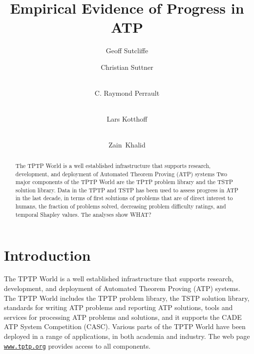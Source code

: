 \documentclass[runningheads]{llncs}
\begin{document}
\title{Empirical Evidence of Progress in ATP}

\author{
Geoff Sutcliffe
\and
Christian Suttner
\and \\
C. Raymond Perrault
\and \\
Lars Kotthoff
\and \\
Zain~Khalid
}

\maketitle
\begin{abstract}
The TPTP World is a well established infrastructure that supports research, development, and 
deployment of Automated Theorem Proving (ATP) systems
Two major components of the TPTP World are the TPTP problem library and the TSTP solution library.
Data in the TPTP and TSTP has been used to assess progress in ATP in the last decade, in
terms of first solutions of problems that are of direct interest to humans, the fraction of
problems solved, decreasing problem difficulty ratings, and temporal Shapley values.
The analyses show WHAT?

\end{abstract}
\section{Introduction}
\label{Introduction}

The TPTP World \cite{Sut17} is a well established infrastructure that supports research, 
development, and deployment of Automated Theorem Proving (ATP) systems.
The TPTP World includes the TPTP problem library,
the TSTP solution library,
standards for writing ATP problems and reporting ATP solutions,
tools and services for processing ATP problems and solutions,
and it supports the CADE ATP System Competition (CASC).
Various parts of the TPTP World have been deployed in a range of applications,
in both academia and industry.
The web page \href{https://www.tptp.org}{\tt www.tptp.org} provides access to all 
components.
\end{document}
